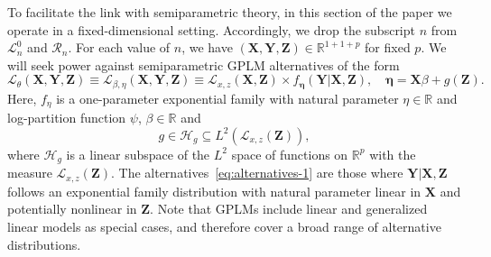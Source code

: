 \documentclass[12pt]{article}
\theoremstyle{definition}
\theoremstyle{remark}
\newcommand{\R}{\mathbb{R}}								%
\newcommand{\prx}{\bm X}								%
\newcommand{\prz}{\bm Z}								%
\newcommand{\pry}{{\bm Y}}								%
\newcommand{\law}{\mathcal L}							%
\newcommand{\nulllaws}{\mathscr L^0}					%
\newcommand{\regclass}{\mathscr R}					    %
\renewcommand{\H}{\mathcal H}		 					%
\begin{document}
	To facilitate the link with semiparametric theory, in this section of the paper we operate in a fixed-dimensional setting. Accordingly, we drop the subscript $n$ from $\nulllaws_n$ and $\regclass_n$. For each value of $n$, we have $(\prx, \pry, \prz) \in \R^{1 + 1 + p}$ for fixed $p$. We will seek power against semiparametric GPLM alternatives of the form
	\begin{equation}
		\law_{\theta}(\prx, \pry, \prz) \equiv \law_{\beta, \eta}(\prx, \pry, \prz) \equiv \law_{x,z}(\prx, \prz) \times f_{\bm \eta}(\pry|\prx, \prz),\quad \bm \eta = \prx \beta + g(\prz).
		\label{eq:alternatives-1}
	\end{equation}
	Here, $f_\eta$ is a one-parameter exponential family with natural parameter $\eta \in \R$ and log-partition function $\psi$, $\beta \in \R$ and 
	\begin{equation}
		g \in \H_g \subseteq L^2(\law_{x,z}(\bm Z)), 
	\end{equation}
	where $\H_g$ is a linear subspace of the $L^2$ space of functions on $\R^p$ with the measure $\law_{x,z}(\bm Z)$. The alternatives~\eqref{eq:alternatives-1} are those where $\pry|\prx,\prz$ follows an exponential family distribution with natural parameter linear in $\prx$ and potentially nonlinear in $\prz$. Note that GPLMs include linear and generalized linear models as special cases, and therefore cover a broad range of alternative distributions.
	
\end{document}
